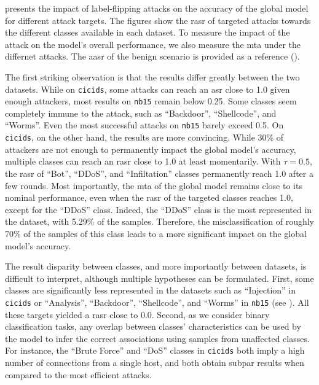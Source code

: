  presents the impact of label-flipping attacks on the accuracy of the global model for different attack targets.
The figures show the \gls{rasr} of targeted attacks towards the different classes available in each dataset.
To measure the impact of the attack on the model's overall performance, we also measure the \gls{mta} under the differnet attacks.
The \gls{aasr} of the benign scenario is provided as a reference (\cf {}).

The first striking observation is that the results differ greatly between the two datasets.
While on \texttt{cicids}, some attacks can reach an \gls{asr} close to 1.0 given enough attackers, most results on \texttt{nb15} remain below 0.25.
Some classes seem completely immune to the attack, such as ``Backdoor'', ``Shellcode'', and ``Worms''.
Even the most successful attacks on \texttt{nb15} barely exceed 0.5.
On \texttt{cicids}, on the other hand, the results are more convincing.
While 30\% of attackers are not enough to permanently impact the global model's accuracy, multiple classes can reach an \gls{rasr} close to 1.0 at least momentarily.
With $\tau=0.5$, the \gls{rasr} of ``Bot'', ``DDoS'', and ``Infiltation'' classes permanently reach 1.0 after a few rounds.
Most importantly, the \gls{mta} of the global model remains close to its nominal performance, even when the \gls{rasr} of the targeted classes reaches 1.0, except for the ``DDoS'' class.
Indeed, the ``DDoS'' class is the most represented in the dataset, with 5.29\% of the samples. 
Therefore, the misclassification of roughly 70\% of the samples of this class leads to a more significant impact on the global model's accuracy.

The result disparity between classes, and more importantly between datasets, is difficult to interpret, although multiple hypotheses can be formulated.
First, some classes are significantly less represented in the datasets such as ``Injection'' in \texttt{cicids} or ``Analysis'', ``Backdoor'', ``Shellcode'', and ``Worms'' in \texttt{nb15} (see ).
All these targets yielded a \gls{rasr} close to 0.0.
Second, as we consider binary classification tasks, any overlap between classes' characteristics can be used by the model to infer the correct associations using samples from unaffected classes.
For instance, the ``Brute Force'' and ``DoS'' classes in \texttt{cicids} both imply a high number of connections from a single host, and both obtain subpar results when compared to the most efficient attacks.

